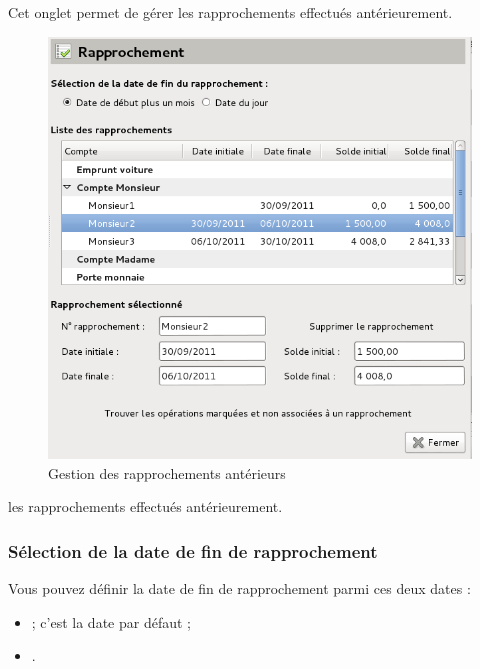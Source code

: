 Cet onglet permet de gérer \ifIllustration les rapprochements effectués antérieurement.

\begin{figure}[htb]
\begin{center}
\includegraphics[scale=0.5]{image/screenshot/setup_reconciliation}
\end{center}
\caption{Gestion des rapprochements antérieurs}
\label{setup-reconciliation-img}
\end{figure}
\else les rapprochements effectués antérieurement.
\fi


\subsubsection{Sélection de la date de fin de rapprochement\label{setup-operations-reconciliation-date}}

Vous pouvez définir la date de fin de rapprochement
 parmi ces deux dates :
\begin{itemize}
	\item {} ; c'est la date par défaut ;
	\item {}.
\end{itemize}


